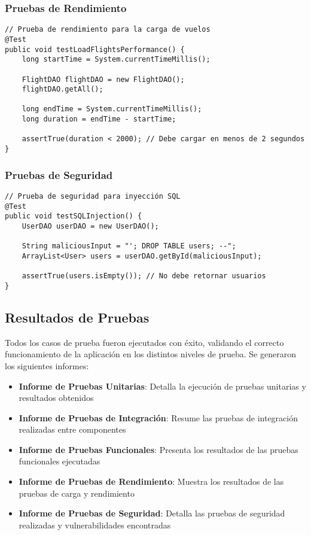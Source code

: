 \documentclass[12pt,a4paper]{article}
\begin{document}
\subsubsection{Pruebas de Rendimiento}

\begin{verbatim}
// Prueba de rendimiento para la carga de vuelos
@Test
public void testLoadFlightsPerformance() {
    long startTime = System.currentTimeMillis();

    FlightDAO flightDAO = new FlightDAO();
    flightDAO.getAll();

    long endTime = System.currentTimeMillis();
    long duration = endTime - startTime;

    assertTrue(duration < 2000); // Debe cargar en menos de 2 segundos
}
\end{verbatim}

\subsubsection{Pruebas de Seguridad}

\begin{verbatim}
// Prueba de seguridad para inyección SQL
@Test
public void testSQLInjection() {
    UserDAO userDAO = new UserDAO();

    String maliciousInput = "'; DROP TABLE users; --";
    ArrayList<User> users = userDAO.getById(maliciousInput);

    assertTrue(users.isEmpty()); // No debe retornar usuarios
}
\end{verbatim}

\subsection{Resultados de Pruebas}

Todos los casos de prueba fueron ejecutados con éxito, validando el correcto funcionamiento de la aplicación en los distintos niveles de prueba. Se generaron los siguientes informes:

\begin{itemize}
    \item \textbf{Informe de Pruebas Unitarias}: Detalla la ejecución de pruebas unitarias y resultados obtenidos
    \item \textbf{Informe de Pruebas de Integración}: Resume las pruebas de integración realizadas entre componentes
    \item \textbf{Informe de Pruebas Funcionales}: Presenta los resultados de las pruebas funcionales ejecutadas
    \item \textbf{Informe de Pruebas de Rendimiento}: Muestra los resultados de las pruebas de carga y rendimiento
    \item \textbf{Informe de Pruebas de Seguridad}: Detalla las pruebas de seguridad realizadas y vulnerabilidades encontradas
\end{itemize}
\end{document}
